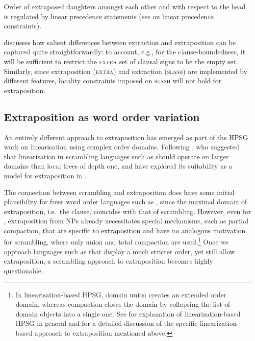 \documentclass[output=paper
,notxmath 
 	        ,biblatex
                ,babelshorthands
                ,newtxmath
                ,draftmode
                ,colorlinks, citecolor=brown
]{langscibook}
\begin{document}
Order of extraposed daughters amongst each other and with respect to
the head is regulated by linear precedence statements (see
 on linear precedence
constraints).

\citet{Keller:95} discusses how salient differences between extraction
and extraposition can be captured quite straightforwardly: to account,
e.g., for the clause-boundedness, it will be sufficient to restrict
the \textsc{extra} set of clausal signs to be the empty
set. Similarly, since extraposition (\textsc{extra}) and extraction
(\textsc{slash}) are implemented by different features, locality
constraints imposed on \textsc{slash} will not hold for extraposition.


\subsection{Extraposition as word order variation}

An entirely different approach to extraposition has emerged as part of
the HPSG work on linearisation using complex order domains. Following
\citet{Reape:94}, who suggested that linearisation in scrambling
languages such as  should operate on larger domains than local
trees of depth one, \citet{Kathol:95b,kathol_a00} and \citet{KP95a}
have explored its suitability as a model for extraposition in .

The connection between scrambling and extraposition does have some
initial plausibility for freer word order languages such as ,
since the maximal domain of extraposition, i.e.\ the clause, coincides
with that of scrambling. However, even for , extraposition from
NPs already necessitates special mechanisms, such as partial
compaction, that are specific to extraposition and have no analogous
motivation for scrambling, where only union and total compaction are
used.\footnote{In linearisation-based HPSG, domain union creates an
  extended order domain, whereas compaction closes the domain by
  collapsing the list of domain objects into a single one. See  for
  explanation of linearization-based HPSG in general and
   for a detailed discussion of the specific linearization-based
  approach to extraposition mentioned above.
} Once we
approach languages such as  that display a much stricter order,
yet still allow extraposition, a scrambling approach to extraposition
becomes highly questionable.
\end{document}
